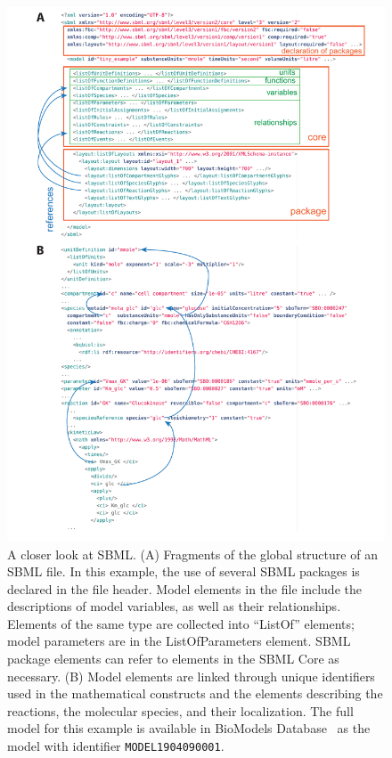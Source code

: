 \documentclass{sbml-paper}
\begin{document}
\begin{figure}[p]
  \center
  \includegraphics[width=.9\textwidth]{resources/SBML_XML_example_v03.pdf}
  \caption{A closer look at SBML. (A) Fragments of the global structure of an SBML file. In this example, the use of several SBML packages is declared in the file header. Model elements in the file include the descriptions of model variables, as well as their relationships.  Elements of the same type are collected into ``ListOf'' elements; \eg model parameters are in the ListOfParameters element. SBML package elements can refer to elements in the SBML Core as necessary. (B) Model elements are linked through unique identifiers used in the mathematical constructs and the elements describing the reactions, the molecular species, and their localization. The full model for this example is available in BioModels Database~\citep{chelliah2014biomodels} as the model with identifier \texttt{MODEL1904090001}.}
\label{fig:examples-sbml}
\end{figure}

\clearpage
\newpage
\end{document}
